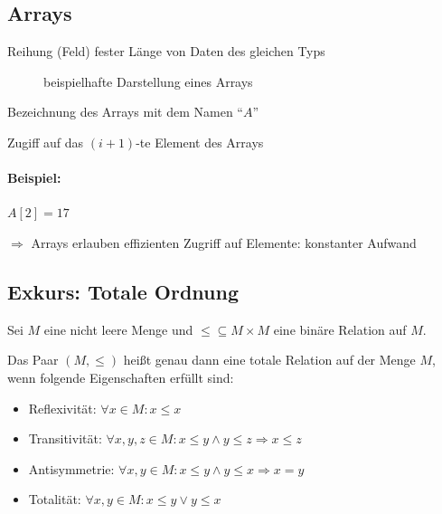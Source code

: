 \documentclass[
    ngerman,
    color=3b,
    dark_mode,
    load_common, %
    summary,
    boxarc,
]{rubos-tuda-template}
\begin{document}
\subsection{Arrays}\label{2.2}\label{Arrays}
\begin{definition}[Array]
    Reihung (Feld) fester Länge von Daten des gleichen Typs
\end{definition}
\begin{figure}[h]
    \centering
    \caption{beispielhafte Darstellung eines Arrays}
    \label{fig:array_beispiel}
\end{figure}
\begin{description}[leftmargin=1cm]
    \item [$A$] Bezeichnung des Arrays mit dem Namen "`$A$"'
    \item [{$A[i]$}] Zugiff auf das $(i+1)$-te Element des Arrays
\end{description}
\paragraph{Beispiel:}\mbox{}
\begin{grayInfoBox}
    $A[2]=17$
\end{grayInfoBox}
$\Longrightarrow$ Arrays erlauben effizienten Zugriff auf Elemente: konstanter Aufwand
\clearpage
\subsection{Exkurs: Totale Ordnung}\label{Totale Ordnung}
\begin{definition}
    Sei $M$ eine nicht leere Menge und $\leq \subseteq M\times M $ eine binäre Relation auf $M$.

    Das Paar $(M,\leq)$ hei\ss{}t genau dann eine totale Relation auf der Menge $M$, wenn folgende Eigenschaften erfüllt sind:
    \begin{itemize}
        \item Reflexivität: $\forall x \in M: x \leq x$
        \item Transitivität: $\forall x,y,z\in M: x\leq y \land y \leq z \Rightarrow x \leq z$
        \item Antisymmetrie: $\forall x,y\in M: x\leq y \land y \leq x \Rightarrow x = y$
        \item Totalität: $\forall x,y \in M : x\leq y \lor y \leq x$
    \end{itemize}
\end{definition}
\end{document}
